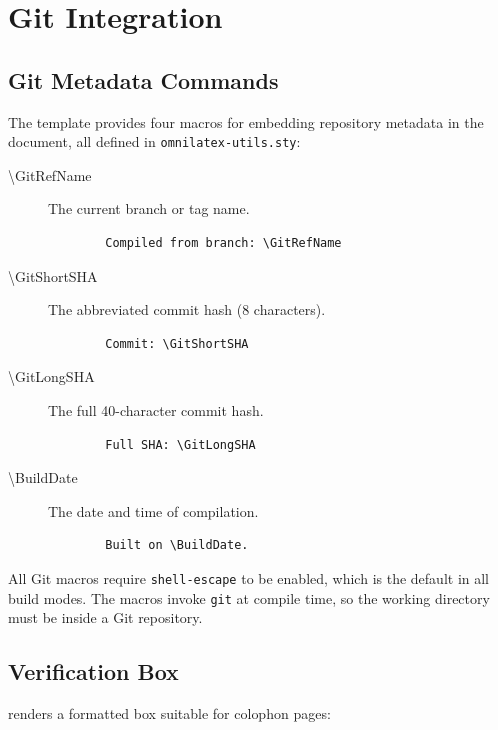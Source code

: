 \chapter{Git Integration}
\label{ch:git}

\section{Git Metadata Commands}

The template provides four macros for embedding repository metadata in the
document, all defined in \texttt{omnilatex-utils.sty}:

\begin{description}
  \item[{\textbackslash GitRefName}] The current branch or tag name.
        \begin{verbatim}
        Compiled from branch: \GitRefName
        \end{verbatim}

  \item[{\textbackslash GitShortSHA}] The abbreviated commit hash (8 characters).
        \begin{verbatim}
        Commit: \GitShortSHA
        \end{verbatim}

  \item[{\textbackslash GitLongSHA}] The full 40-character commit hash.
        \begin{verbatim}
        Full SHA: \GitLongSHA
        \end{verbatim}

  \item[{\textbackslash BuildDate}] The date and time of compilation.
        \begin{verbatim}
        Built on \BuildDate.
        \end{verbatim}
\end{description}

All Git macros require \texttt{shell-escape} to be enabled, which is the
default in all build modes.  The macros invoke \texttt{git} at compile
time, so the working directory must be inside a Git repository.

\section{Verification Box}

 renders a formatted box suitable for colophon pages:

